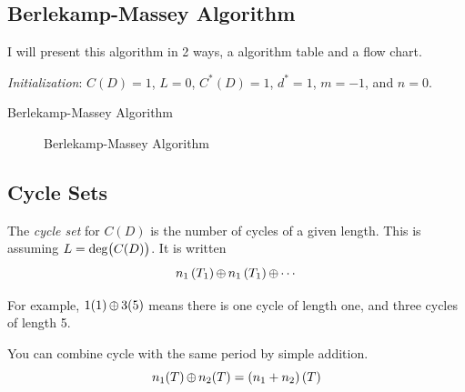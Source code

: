 \subsection{Berlekamp-Massey Algorithm}\label{subsec:Berlekamp_Massey_Algorithm}
I will present this algorithm in 2 ways, a algorithm table and a flow chart.

\begin{algorithm}[H]
  \DontPrintSemicolon{}
  
  \BlankLine{}
  \textit{Initialization}: $C(D) = 1$, $L=0$, $C^{*}(D) = 1$, $d^{*} = 1$, $m = -1$, and $n=0$. \;
  \caption{Berlekamp-Massey Algorithm}
  \label{fig:Berlekamp_Massey_Algorithm}
\end{algorithm}

\begin{figure}[h!]
  \centering
  
  \caption{Berlekamp-Massey Algorithm}
  \label{fig:Berlekamp_Massey_Algorithm}
\end{figure}

\subsection{Cycle Sets}\label{subsec:Cycle_Sets}
\begin{definition}\label{def:Cycle_Set}
  The \emph{cycle set} for $C(D)$ is the number of cycles of a given length.
  This is assuming $L = \operatorname{\operatorname{deg}} \bigl( C(D) \bigr)$.
  It is written
  \begin{equation}\label{eq:Cycle_Set}
    n_{1} \left( T_{1} \right) \operatorname{\oplus} n_{1} \left( T_{1} \right) \operatorname{\oplus} \cdots
  \end{equation}

  For example, $1(1) \operatorname{\oplus} 3(5)$ means there is one cycle of length one, and three cycles of length 5.

  \begin{remark}[Combining]
    You can combine cycle with the same period by simple addition.
    \begin{equation}\label{eq:Cycle_Set_Addition}
      n_{1}(T) \operatorname{\oplus} n_{2}(T) =  \left( n_{1} + n_{2} \right) (T)
    \end{equation}
  \end{remark}
\end{definition}

